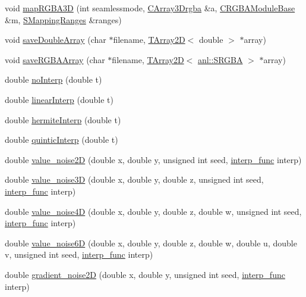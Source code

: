 \begin{DoxyCompactItemize}
void \hyperlink{namespaceanl_a2d90ac45f459600dc84db21e6f880587}{mapRGBA3D} (int seamlessmode, \hyperlink{classTArray3D}{CArray3Drgba} \&a, \hyperlink{classanl_1_1CRGBAModuleBase}{CRGBAModuleBase} \&m, \hyperlink{structanl_1_1SMappingRanges}{SMappingRanges} \&ranges)
\item 
void \hyperlink{namespaceanl_afc417846b4790dc37e817455621a68b4}{saveDoubleArray} (char $\ast$filename, \hyperlink{classTArray2D}{TArray2D}$<$ double $>$ $\ast$array)
\item 
void \hyperlink{namespaceanl_aeb0dcff0d6e0bb67b7ec1846d10b3b53}{saveRGBAArray} (char $\ast$filename, \hyperlink{classTArray2D}{TArray2D}$<$ \hyperlink{structanl_1_1SRGBA}{anl::SRGBA} $>$ $\ast$array)
\item 
double \hyperlink{namespaceanl_a8fe5f45ca9fede2abfa5f0f54e191fdc}{noInterp} (double t)
\item 
double \hyperlink{namespaceanl_a68b907cc1000b730d772b56d99ccc41f}{linearInterp} (double t)
\item 
double \hyperlink{namespaceanl_a6251423b45b56c17ffa27b6ee9d3a252}{hermiteInterp} (double t)
\item 
double \hyperlink{namespaceanl_a493bd7a0c2877728adce6adc9f0d58fc}{quinticInterp} (double t)
\item 
double \hyperlink{namespaceanl_a72f62b425143885b56b0d5dcac91b532}{value\_\-noise2D} (double x, double y, unsigned int seed, \hyperlink{namespaceanl_a2c8cd5d25499b47ef49c82dea75ba8dd}{interp\_\-func} interp)
\item 
double \hyperlink{namespaceanl_a9c7d33a72dc01a3c32dd2a3e6e2b5cd0}{value\_\-noise3D} (double x, double y, double z, unsigned int seed, \hyperlink{namespaceanl_a2c8cd5d25499b47ef49c82dea75ba8dd}{interp\_\-func} interp)
\item 
double \hyperlink{namespaceanl_a746ce8b5e8d01f7027ffa8fb94d238ed}{value\_\-noise4D} (double x, double y, double z, double w, unsigned int seed, \hyperlink{namespaceanl_a2c8cd5d25499b47ef49c82dea75ba8dd}{interp\_\-func} interp)
\item 
double \hyperlink{namespaceanl_a801eda379726da881db97906505fd396}{value\_\-noise6D} (double x, double y, double z, double w, double u, double v, unsigned int seed, \hyperlink{namespaceanl_a2c8cd5d25499b47ef49c82dea75ba8dd}{interp\_\-func} interp)
\item 
double \hyperlink{namespaceanl_a8fd5529d1a730cad3558b0f65e94de8d}{gradient\_\-noise2D} (double x, double y, unsigned int seed, \hyperlink{namespaceanl_a2c8cd5d25499b47ef49c82dea75ba8dd}{interp\_\-func} interp)

\end{DoxyCompactItemize}
